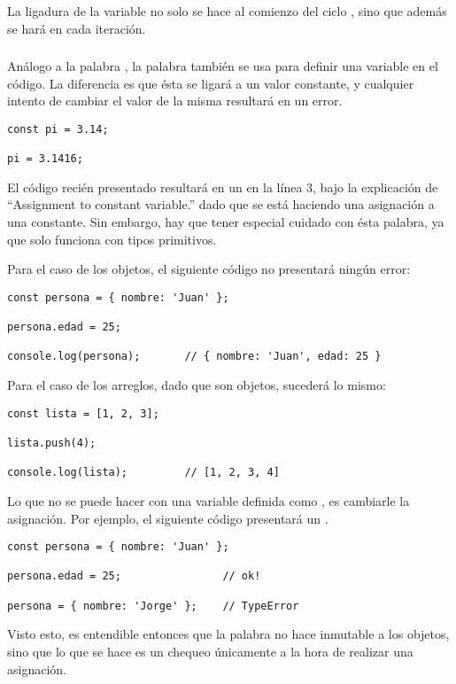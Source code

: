 La ligadura de la variable  no solo se hace al comienzo del ciclo , sino que además se hará en cada iteración.

\subsubsection{}

Análogo a la palabra , la palabra  también se usa para definir una variable en el código. La diferencia es que ésta se ligará a un valor constante, y cualquier intento de cambiar el valor de la misma resultará en un error.

\begin{lstlisting}[title={Intentando cambiar el valor a una constante}]
const pi = 3.14;

pi = 3.1416;
\end{lstlisting}

El código recién presentado resultará en un  en la línea 3, bajo la explicación de "`Assignment to constant variable.​​"' dado que se está haciendo una asignación a una constante. Sin embargo, hay que tener especial cuidado con ésta palabra, ya que solo funciona con tipos primitivos.

Para el caso de los objetos, el siguiente código no presentará ningún error:

\begin{lstlisting}[title={\code{const} sobre objetos}]
const persona = { nombre: 'Juan' };

persona.edad = 25;

console.log(persona);		// ​​​​​{ nombre: 'Juan', edad: 25 }​​​​​
\end{lstlisting}

Para el caso de los arreglos, dado que son objetos, sucederá lo mismo:

\begin{lstlisting}[title={\code{const} sobre arreglos}]
const lista = [1, 2, 3];

lista.push(4);

console.log(lista);			// [1, 2, 3, 4]
\end{lstlisting}

Lo que no se puede hacer con una variable definida como , es cambiarle la asignación. Por ejemplo, el siguiente código presentará un .

\begin{lstlisting}
const persona = { nombre: 'Juan' };

persona.edad = 25;                // ok!

persona = { nombre: 'Jorge' };    // TypeError
\end{lstlisting}

Visto esto, es entendible entonces que la palabra  no hace inmutable a los objetos, sino que lo que se hace es un chequeo únicamente a la hora de realizar una asignación.